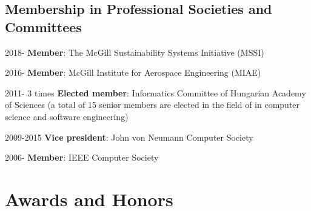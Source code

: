 \subsection{Membership in Professional Societies and Committees}
\begin{yearlist}
\item[2018-] \textbf{Member}: The McGill Sustainability Systems Initiative (MSSI)
\item[2016-] \textbf{Member}: McGill Institute for Aerospace Engineering (MIAE)
\item[2011-] 3 times \textbf{Elected member}: Informatics Committee of Hungarian Academy of Sciences (a total of 15 senior members are elected in the field of in computer science and software engineering)
\item[2009-2015] \textbf{Vice president}: John von Neumann Computer Society 
\item[2006-] \textbf{Member}: IEEE Computer Society 
\end{yearlist}


\section{Awards and Honors} 

